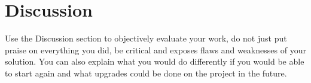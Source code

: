 \documentclass[fleqn,moreauthors,10pt]{ds_report}
\begin{document}
\section*{Discussion}

Use the Discussion section to objectively evaluate your work, do not just put praise on everything you did, be critical and exposes flaws and weaknesses of your solution. You can also explain what you would do differently if you would be able to start again and what upgrades could be done on the project in the future.




\end{document}
